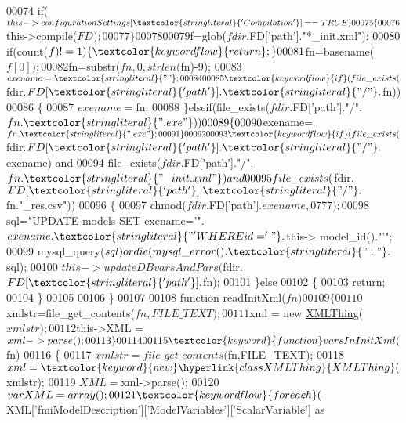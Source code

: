 \begin{DoxyCode}
00074     \textcolor{keywordflow}{if}($this->configurationSettings[\textcolor{stringliteral}{'Compilation'}]==TRUE)
00075     \{
00076       $this->compile($FD);
00077     \}
00078     
00079     $f=glob($fdir.$FD[\textcolor{stringliteral}{'path'}].\textcolor{stringliteral}{"*\_init.xml"});
00080     \textcolor{keywordflow}{if}(count($f)!=1)\{\textcolor{keywordflow}{return};\}
00081     $fn=basename($f[0]);
00082     $fn=substr($fn,0,strlen($fn)-9);
00083     $exename=\textcolor{stringliteral}{""};
00084 
00085     \textcolor{keywordflow}{if}(file\_exists($fdir.$FD[\textcolor{stringliteral}{'path'}].\textcolor{stringliteral}{"/"}.$fn))
00086     \{
00087       $exename=$fn;
00088     \}elseif(file\_exists($fdir.$FD[\textcolor{stringliteral}{'path'}].\textcolor{stringliteral}{"/"}.$fn.\textcolor{stringliteral}{".exe"}))
00089     \{
00090       $exename=$fn.\textcolor{stringliteral}{".exe"};
00091     \}
00092 
00093    \textcolor{keywordflow}{if}(file\_exists($fdir.$FD[\textcolor{stringliteral}{'path'}].\textcolor{stringliteral}{"/"}.$exename) and 
00094        file\_exists($fdir.$FD[\textcolor{stringliteral}{'path'}].\textcolor{stringliteral}{"/"}.$fn.\textcolor{stringliteral}{"\_init.xml"}) and
00095        file\_exists($fdir.$FD[\textcolor{stringliteral}{'path'}].\textcolor{stringliteral}{"/"}.$fn.\textcolor{stringliteral}{"\_res.csv"}))
00096     \{
00097       chmod($fdir.$FD[\textcolor{stringliteral}{'path'}].$exename,0777);
00098       $sql=\textcolor{stringliteral}{"UPDATE models SET exename='"}.$exename.\textcolor{stringliteral}{"' WHERE id='"}.$this->
      model\_id().\textcolor{stringliteral}{"'"};
00099       mysql\_query($sql) or die(mysql\_error().\textcolor{stringliteral}{": "}.$sql);
00100       $this->updateDBvarsAndPars($fdir.$FD[\textcolor{stringliteral}{'path'}].$fn);
00101     \}\textcolor{keywordflow}{else}
00102     \{
00103       \textcolor{keywordflow}{return};
00104     \}
00105 
00106   \}
00107   
00108   \textcolor{keyword}{function} readInitXml($fn)
00109   \{
00110     $xmlstr=file\_get\_contents($fn,FILE\_TEXT);
00111     $xml = \textcolor{keyword}{new} \hyperlink{classXMLThing}{XMLThing}($xmlstr);
00112     $this->XML = $xml->parse();
00113   \}  
00114   
00115   \textcolor{keyword}{function} varsInInitXml($fn)
00116   \{
00117     $xmlstr=file\_get\_contents($fn,FILE\_TEXT);
00118     $xml = \textcolor{keyword}{new} \hyperlink{classXMLThing}{XMLThing}($xmlstr);
00119     $XML = $xml->parse();
00120     $varXML=array();
00121     \textcolor{keywordflow}{foreach}($XML[\textcolor{stringliteral}{'fmiModelDescription'}][\textcolor{stringliteral}{'ModelVariables'}][\textcolor{stringliteral}{'ScalarVariable'}] as 

\end{DoxyCode}
